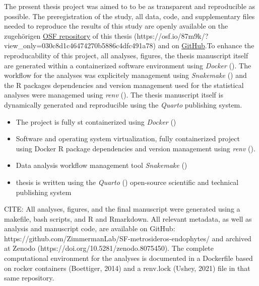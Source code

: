 \documentclass[
  12pt,
]{scrartcl}
\providecommand{\tightlist}{%
  \setlength{\itemsep}{0pt}\setlength{\parskip}{0pt}}\usepackage{longtable,booktabs,array}
\begin{document}
The present thesis project was aimed to to be as transparent and
reproducible as possible. The preregistration of the study, all data,
code, and supplementary files needed to reproduce the results of this
study are openly available on the zugehörigen
\href{https://osf.io/87m9k/?view_only=030c8d1c46474270b5886c4dfc491a78}{OSF
repository} of this thesis
(https://osf.io/87m9k/?view\_only=030c8d1c46474270b5886c4dfc491a78) and
on \href{https://github.com/jlschnatz/bachelor-thesis}{GitHub}.To
enhance the reproducability of this project, all analyses, figures, the
thesis manuscript itself are generated within a containerized software
environment using \emph{Docker}
(). The workflow for the
analyses was explicitely management using \emph{Snakemake}
() and the R
packages dependencies and version management used for the statistical
analyses were managemed using \emph{renv}
(). The thesis
manuscript itself is dynamically generated and reproducible using the
\emph{Quarto} publishing system.

\begin{itemize}
\tightlist
\item
  The project is fully st containerized using \emph{Docker}
  ()
\item
  Software and operating system virtualization, fully containerized
  project using Docker R package dependencies and version management
  using \emph{renv} ().
\item
  Data analysis workflow management tool \emph{Snakemake}
  ()
\item
  thesis is written using the \emph{Quarto}
  () open-source
  scientific and technical publishing system
\end{itemize}

CITE: All analyses, figures, and the final manuscript were generated
using a makefile, bash scripts, and R and Rmarkdown. All relevant
metadata, as well as analysis and manuscript code, are available on
GitHub: https://github.com/ZimmermanLab/SF-metrosideros-endophytes/ and
archived at Zenodo (https://doi.org/10.5281/zenodo.8075450). The
complete computational environment for the analyses is documented in a
Dockerfile based on rocker containers (Boettiger, 2014) and a renv.lock
(Ushey, 2021) file in that same repository.
\end{document}
